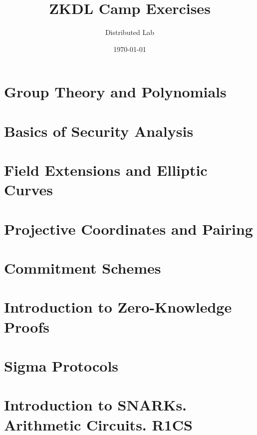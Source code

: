 \documentclass{zkdl-tests-template}
\title{\huge\sffamily\bfseries ZKDL Camp Exercises}
\author{\Large\sffamily Distributed Lab}
\date{\sffamily \today}
\begin{document}
\pagestyle{fancy}

\maketitle

\pagebreak

\tableofcontents

\pagebreak

\section{Group Theory and Polynomials}



\section{Basics of Security Analysis}\label{section:math-crypto-2}



\section{Field Extensions and Elliptic Curves}



\section{Projective Coordinates and Pairing}



\section{Commitment Schemes}



\section{Introduction to Zero-Knowledge Proofs}



\section{Sigma Protocols}



\section{Introduction to SNARKs. Arithmetic Circuits. R1CS}


\end{document}
